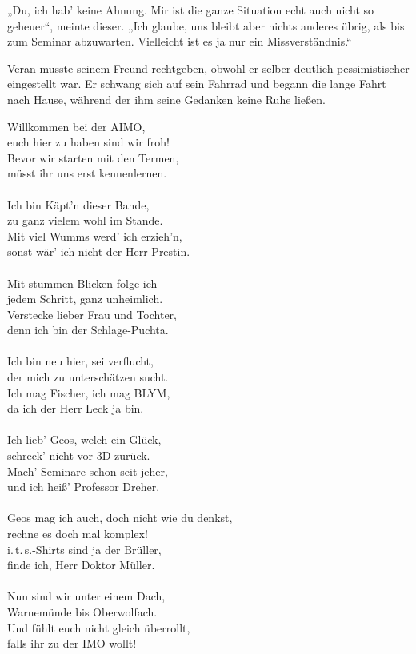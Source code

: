 \documentclass[oneside]{memoir}
\begin{document}
„Du, ich hab' keine Ahnung. Mir ist die ganze Situation echt auch nicht so geheuer“, meinte dieser. „Ich glaube, uns bleibt aber nichts anderes übrig, als bis zum Seminar abzuwarten. Vielleicht ist es ja nur ein Missverständnis.“

Veran musste seinem Freund rechtgeben, obwohl er selber deutlich pessimistischer eingestellt war. Er schwang sich auf sein Fahrrad und begann die lange Fahrt nach Hause, während der ihm seine Gedanken keine Ruhe ließen.
\newpage
\thispagestyle{plain}
\begin{singlespace}
Willkommen bei der AIMO, \\
euch hier zu haben sind wir froh! \\
Bevor wir starten mit den Termen, \\
müsst ihr uns erst kennenlernen. \\  \\

Ich bin Käpt'n dieser Bande, \\
zu ganz vielem wohl im Stande. \\
Mit viel Wumms werd' ich erzieh'n, \\
sonst wär' ich nicht der Herr Prestin. \\ \\

Mit stummen Blicken folge ich \\
jedem Schritt, ganz unheimlich. \\
Verstecke lieber Frau und Tochter, \\
denn ich bin der Schlage-Puchta. \\ \\

Ich bin neu hier, sei verflucht, \\
der mich zu unterschätzen sucht. \\
Ich mag Fischer, ich mag BLYM, \\
da ich der Herr Leck ja bin. \\ \\

Ich lieb' Geos, welch ein Glück, \\
schreck' nicht vor 3D zurück. \\
Mach' Seminare schon seit jeher, \\
und ich heiß' Professor Dreher. \\ \\

Geos mag ich auch, doch nicht wie du denkst, \\
rechne es doch mal komplex! \\
i.\,t.\,s.-Shirts sind ja der Brüller, \\
finde ich, Herr Doktor Müller. \\ \\

Nun sind wir unter einem Dach, \\
Warnemünde bis Oberwolfach. \\
Und fühlt euch nicht gleich überrollt, \\
falls ihr zu der IMO wollt!
\end{singlespace}
\end{document}
